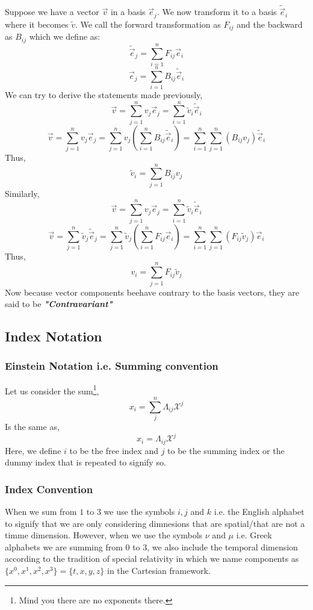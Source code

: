 Suppose we have a vector $\vec{v}$ in a basis $\vec{e}_j$. We now transform it to a basis $\tilde{\vec{e}}_i$ where it becomes $\tilde{v}$. We call the forward transformation as $F_{ij}$ and the backward as $B_{ij}$ which we define as:
$$\tilde{\vec{e}}_j = \sum_{i = 1}^{n} F_{ij} \vec{e}_i$$
$$\vec{e}_j = \sum_{i = 1}^{n} B_{ij} \tilde{\vec{e}}_i$$
We can try to derive the statements made previously,
$$\vec{v} = \sum_{j = 1}^{n} v_{j}\vec{e}_j = \sum_{i = 1}^{n} \tilde{v}_{i}\tilde{\vec{e}}_i$$
$$\vec{v} = \sum_{j = 1}^{n} v_{j}\vec{e}_j = \sum_{j = 1}^{n} {v}_{j}(\sum_{i=1}^{n} B_{ij} \tilde{\vec{e}}_i) =  \sum_{i = 1}^{n} \sum_{j = 1}^{n} (B_{ij} {v}_{j}) \tilde{\vec{e}}_i$$
Thus,
\begin{equation}
	\tilde{v}_i = \sum_{j = 1}^{n} B_{ij} {v}_{j}
\end{equation}
Similarly,
$$\vec{v} = \sum_{j = 1}^{n} v_{j}\vec{e}_j = \sum_{i = 1}^{n} \tilde{v}_{i}\tilde{\vec{e}}_i$$
$$\vec{v} = \sum_{j = 1}^{n} \tilde{v}_{j}\tilde{\vec{e}}_j = \sum_{j = 1}^{n} \tilde{v}_{j}(\sum_{i = 1}^{n} F_{ij} \vec{e}_i) =  \sum_{i = 1}^{n} \sum_{j = 1}^{n} (F_{ij} \tilde{v}_{j}) {\vec{e}}_i$$
Thus,
\begin{equation}
	{v}_i = \sum_{j = 1}^{n} F_{ij} \tilde{v}_{j}
\end{equation}
Now because vector components beehave contrary to the basis vectors, they are said to be \textit{\textbf{"Contravariant"}}
\subsection{Index Notation}
\subsubsection{Einstein Notation i.e. Summing convention}
Let us consider the sum\footnote{Mind you there are no exponents there.},
$$x_{i} = \sum_{j}^{n}\Lambda_{ij}\mathcal{X}^{j}$$
Is the same as,
$$x_{i} = \Lambda_{ij}\mathcal{X}^{j}$$ 
Here, we define $i$ to be the free index and $j$ to be the summing index or the dummy index that is repeated to signify so.
\subsubsection{Index Convention}
When we sum from $1$ to $3$ we use the symbols $i,j$ and $k$ i.e. the English alphabet to signify that we are only considering dimnesions that are spatial/that are not a timme dimension. However, when we use the symbols $\nu$ and $\mu$ i.e. Greek alphabets we are summing from 0 to 3, we also include the temporal dimension according to the tradition of special relativity in which we name components as $\{x^{0}, x^{1}, x^{2}, x^{3}\} = \{t, x, y, z\}$ in the Cartesian framework.

